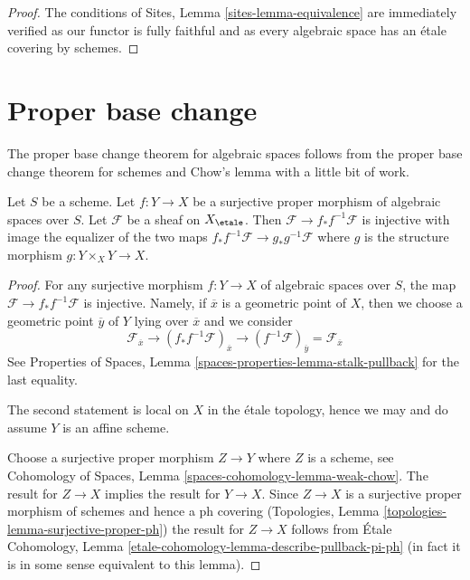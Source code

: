 \begin{proof}
The conditions of Sites, Lemma \ref{sites-lemma-equivalence}
are immediately verified as our functor is fully faithful
and as every algebraic space has an \'etale covering by schemes.
\end{proof}







\section{Proper base change}
\label{section-proper-base-change}

\noindent
The proper base change theorem for algebraic spaces follows from
the proper base change theorem for schemes and Chow's lemma
with a little bit of work.

\begin{lemma}
\label{lemma-surjective-proper}
Let $S$ be a scheme. Let $f : Y \to X$ be a surjective proper morphism
of algebraic spaces over $S$. Let $\mathcal{F}$ be a sheaf on $X_\etale$.
Then $\mathcal{F} \to f_*f^{-1}\mathcal{F}$ is injective with
image the equalizer of the two maps
$f_*f^{-1}\mathcal{F} \to g_*g^{-1}\mathcal{F}$ where
$g$ is the structure morphism $g : Y \times_X Y \to X$.
\end{lemma}

\begin{proof}
For any surjective morphism $f : Y \to X$ of algebraic spaces over $S$,
the map $\mathcal{F} \to f_*f^{-1}\mathcal{F}$ is injective.
Namely, if $\overline{x}$ is a geometric point of $X$, then we
choose a geometric point $\overline{y}$ of $Y$ lying over $\overline{x}$
and we consider
$$
\mathcal{F}_{\overline{x}} \to
(f_*f^{-1}\mathcal{F})_{\overline{x}} \to
(f^{-1}\mathcal{F})_{\overline{y}} = \mathcal{F}_{\overline{x}}
$$
See Properties of Spaces, Lemma \ref{spaces-properties-lemma-stalk-pullback}
for the last equality.

\medskip\noindent
The second statement is local on $X$ in the \'etale topology, hence we may
and do assume $Y$ is an affine scheme.

\medskip\noindent
Choose a surjective proper morphism $Z \to Y$ where $Z$ is a scheme, see
Cohomology of Spaces, Lemma \ref{spaces-cohomology-lemma-weak-chow}.
The result for $Z \to X$ implies the result for $Y \to X$.
Since $Z \to X$ is a surjective proper morphism of schemes
and hence a ph covering
(Topologies, Lemma \ref{topologies-lemma-surjective-proper-ph})
the result for $Z \to X$ follows from
\'Etale Cohomology, Lemma \ref{etale-cohomology-lemma-describe-pullback-pi-ph}
(in fact it is in some sense equivalent to this lemma).
\end{proof}

